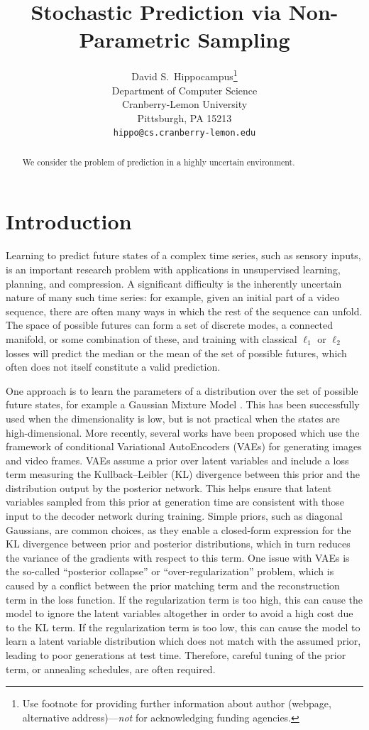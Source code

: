\documentclass{article}
\title{Stochastic Prediction via Non-Parametric Sampling}
\author{
  David S.~Hippocampus\thanks{Use footnote for providing further
    information about author (webpage, alternative
    address)---\emph{not} for acknowledging funding agencies.} \\
  Department of Computer Science\\
  Cranberry-Lemon University\\
  Pittsburgh, PA 15213 \\
  \texttt{hippo@cs.cranberry-lemon.edu} \\
}
\begin{document}

\maketitle

\begin{abstract}
  We consider the problem of prediction in a highly uncertain environment.
\end{abstract}


\section{Introduction}

Learning to predict future states of a complex time series, such as sensory inputs, is an important research problem with applications in unsupervised learning, planning, and compression.
A significant difficulty is the inherently uncertain nature of many such time series: for example, given an initial part of a video sequence, there are often many ways in which the rest of the sequence can unfold.
The space of possible futures can form a set of discrete modes, a connected manifold, or some combination of these, and training with classical $\ell_1$ or $\ell_2$ losses will predict the median or the mean of the set of possible futures, which often does not itself constitute a valid prediction.

One approach is to learn the parameters of a distribution over the set of possible future states, for example a Gaussian Mixture Model \citep{mixture-density-networks}.
This has been successfully used when the dimensionality is low, but is not practical when the states are high-dimensional.
More recently, several works have been proposed which use the framework of conditional Variational AutoEncoders (VAEs) for generating images and video frames.
VAEs assume a prior over latent variables and include a loss term measuring the Kullback–Leibler (KL) divergence between this prior and the distribution output by the posterior network.
This helps ensure that latent variables sampled from this prior at generation time are consistent with those input to the decoder network during training.
Simple priors, such as diagonal Gaussians, are common choices, as they enable a closed-form expression for the KL divergence between prior and posterior distributions, which in turn reduces the variance of the gradients with respect to this term.
One issue with VAEs is the so-called ``posterior collapse'' or ``over-regularization'' problem, which is caused by a conflict between the prior matching term and the reconstruction term in the loss function. If the regularization term is too high, this can cause the model to ignore the latent variables altogether in order to avoid a high cost due to the KL term. If the regularization term is too low, this can cause the model to learn a latent variable distribution which does not match with the assumed prior, leading to poor generations at test time.
Therefore, careful tuning of the prior term, or annealing schedules, are often required.
\end{document}
